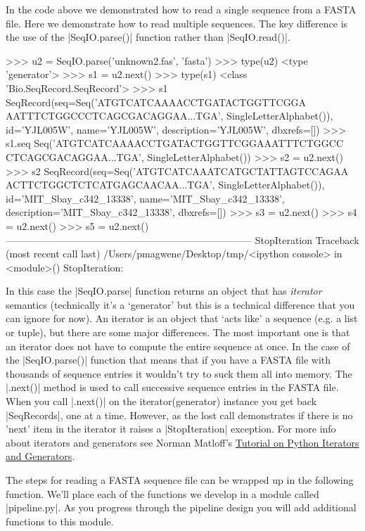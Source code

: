 \documentclass[10pt,letterpaper]{scrartcl}
\begin{document}
In the code above we demonstrated how to read a single sequence from a FASTA file.  Here we demonstrate how to read multiple sequences.  The key difference is the use of the |SeqIO.parse()| function rather than |SeqIO.read()|.

\begin{python}
>>> u2 = SeqIO.parse('unknown2.fas', 'fasta')
>>> type(u2)
<type 'generator'>
>>> s1 = u2.next()
>>> type(s1)
<class 'Bio.SeqRecord.SeqRecord'>
>>> s1
SeqRecord(seq=Seq('ATGTCATCAAAACCTGATACTGGTTCGGA
AATTTCTGGCCCTCAGCGACAGGAA...TGA', SingleLetterAlphabet()), 
id='YJL005W', name='YJL005W', description='YJL005W', dbxrefs=[])
>>> s1.seq
Seq('ATGTCATCAAAACCTGATACTGGTTCGGAAATTTCTGGCC
CTCAGCGACAGGAA...TGA', SingleLetterAlphabet())
>>> s2 = u2.next()
>>> s2
SeqRecord(seq=Seq('ATGTCATCAAATCATGCTATTAGTCCAGAA
ACTTCTGGCTCTCATGAGCAACAA...TGA', SingleLetterAlphabet()), 
id='MIT_Sbay_c342_13338', name='MIT_Sbay_c342_13338', 
description='MIT_Sbay_c342_13338', dbxrefs=[])
>>> s3 = u2.next()
>>> s4 = u2.next()
>>> s5 = u2.next()
---------------------------------------------------------------------------
StopIteration                             Traceback (most recent call last)
/Users/pmagwene/Desktop/tmp/<ipython console> in <module>()
StopIteration: 
\end{python}

In this case the |SeqIO.parse| function returns an object that has \emph{iterator} semantics (technically it's a `generator' but this is a technical difference that you can ignore for now). An iterator is an object that `acts like' a sequence (e.g. a list or tuple), but there are some major differences. The most important one is that an iterator does not have to compute the entire sequence at once. In the case of the |SeqIO.parse()| function that means that if you have a FASTA file with thousands of sequence entries it wouldn't try to suck them all into memory. The |.next()| method is used to call successive sequence entries in the FASTA file. When you call |.next()| on the iterator(generator) instance you get back |SeqRecords|, one at a time. However, as the lost call demonstrates if there is no 'next' item in the iterator it raises a |StopIteration| exception. For more info about iterators and generators see Norman Matloff's  \href{https://github.com/pmagwene/Bio313/raw/master/lecture-13/PyIterGen.pdf}{Tutorial on Python Iterators and Generators}. 

The steps for reading a FASTA sequence file can be wrapped up in the following function. We'll place each of the functions we develop in a module called |pipeline.py|.  As you progress through the pipeline design you will add additional functions to this module.
\end{document}
